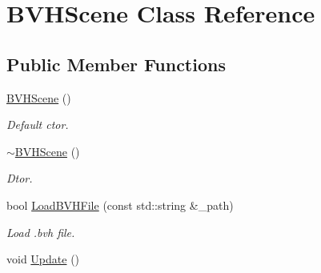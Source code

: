 \hypertarget{class_b_v_h_scene}{}\section{B\+V\+H\+Scene Class Reference}
\label{class_b_v_h_scene}
\subsection*{Public Member Functions}
\begin{DoxyCompactItemize}
\item 
\hyperlink{class_b_v_h_scene_af671a3bf31dcf9ebeed27d1e42d141fb}{B\+V\+H\+Scene} ()\hypertarget{class_b_v_h_scene_af671a3bf31dcf9ebeed27d1e42d141fb}{}\label{class_b_v_h_scene_af671a3bf31dcf9ebeed27d1e42d141fb}

\begin{DoxyCompactList}\small\item\em Default ctor. \end{DoxyCompactList}\item 
\hyperlink{class_b_v_h_scene_abc611b85e4943d2f9fd9b4a240d3ba7b}{$\sim$\+B\+V\+H\+Scene} ()\hypertarget{class_b_v_h_scene_abc611b85e4943d2f9fd9b4a240d3ba7b}{}\label{class_b_v_h_scene_abc611b85e4943d2f9fd9b4a240d3ba7b}

\begin{DoxyCompactList}\small\item\em Dtor. \end{DoxyCompactList}\item 
bool \hyperlink{class_b_v_h_scene_aa9039eebbea8cbc0fef88323a7f8bd41}{Load\+B\+V\+H\+File} (const std\+::string \&\+\_\+path)
\begin{DoxyCompactList}\small\item\em Load .bvh file. \end{DoxyCompactList}\item 
void \hyperlink{class_b_v_h_scene_a5f104d324cb3fa81dbddf16489304a12}{Update} ()\hypertarget{class_b_v_h_scene_a5f104d324cb3fa81dbddf16489304a12}{}\label{class_b_v_h_scene_a5f104d324cb3fa81dbddf16489304a12}


\end{DoxyCompactItemize}
